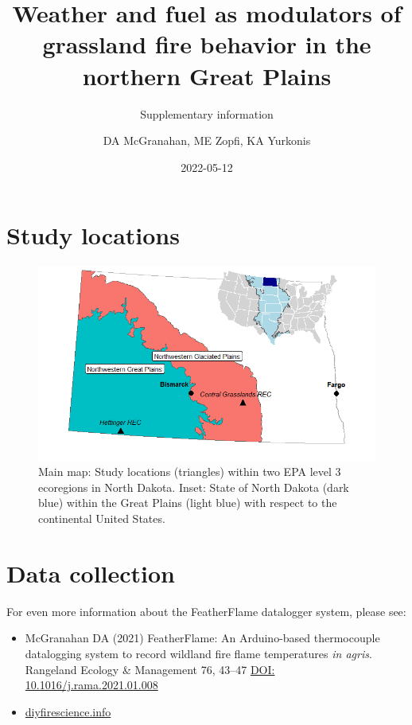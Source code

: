 \documentclass[
]{article}
\title{Weather and fuel as modulators of grassland fire behavior in the
northern Great Plains}
\subtitle{Supplementary information}
\author{DA McGranahan, ME Zopfi, KA Yurkonis}
\date{2022-05-12}
\begin{document}
\maketitle

\hypertarget{study-locations}{%
\section{Study locations}\label{study-locations}}

\begin{figure}

{\centering \includegraphics[width=1\linewidth]{figures/map} 

}

\caption{Main map: Study locations (triangles) within two EPA level 3 ecoregions in North Dakota. Inset: State of North Dakota (dark blue) within the Great Plains (light blue) with respect to the continental United States. \label{fig:map}}\label{fig:unnamed-chunk-1}
\end{figure}
\clearpage

\hypertarget{data-collection}{%
\section{Data collection}\label{data-collection}}

For even more information about the FeatherFlame datalogger system,
please see:

\begin{itemize}
\item
  McGranahan DA (2021) FeatherFlame: An Arduino-based thermocouple
  datalogging system to record wildland fire flame temperatures
  \emph{in agris}. Rangeland Ecology \& Management 76, 43--47
  \href{https://doi.org/10.1016/j.rama.2021.01.008}{DOI:
  10.1016/j.rama.2021.01.008}
\item
  \href{https://diyfirescience.info}{diyfirescience.info}
\end{itemize}
\end{document}
